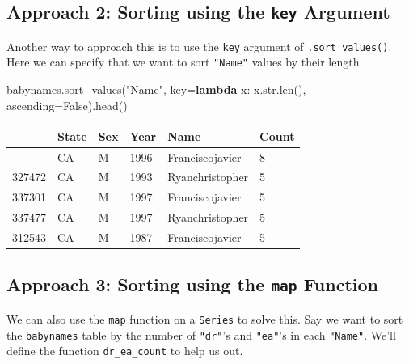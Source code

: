 \documentclass[
  letterpaper,
  DIV=11,
  numbers=noendperiod]{scrreprt}
\newenvironment{Shaded}{\begin{snugshade}}{\end{snugshade}}
\newcommand{\BuiltInTok}[1]{\textcolor[rgb]{0.00,0.23,0.31}{#1}}
\newcommand{\KeywordTok}[1]{\textcolor[rgb]{0.00,0.23,0.31}{\textbf{#1}}}
\newcommand{\NormalTok}[1]{\textcolor[rgb]{0.00,0.23,0.31}{#1}}
\newcommand{\OperatorTok}[1]{\textcolor[rgb]{0.37,0.37,0.37}{#1}}
\newcommand{\StringTok}[1]{\textcolor[rgb]{0.13,0.47,0.30}{#1}}
\newcommand{\VariableTok}[1]{\textcolor[rgb]{0.07,0.07,0.07}{#1}}
\begin{document}
\subsection{\texorpdfstring{Approach 2: Sorting using the \texttt{key}
Argument}{Approach 2: Sorting using the key Argument}}\label{approach-2-sorting-using-the-key-argument}

Another way to approach this is to use the \texttt{key} argument of
\texttt{.sort\_values()}. Here we can specify that we want to sort
\texttt{"Name"} values by their length.

\begin{Shaded}
\begin{Highlighting}[]
\NormalTok{babynames.sort\_values(}\StringTok{"Name"}\NormalTok{, key}\OperatorTok{=}\KeywordTok{lambda}\NormalTok{ x: x.}\BuiltInTok{str}\NormalTok{.}\BuiltInTok{len}\NormalTok{(), ascending}\OperatorTok{=}\VariableTok{False}\NormalTok{).head()}
\end{Highlighting}
\end{Shaded}

\begin{longtable}[]{@{}llllll@{}}
\toprule\noalign{}
& State & Sex & Year & Name & Count \\
\midrule\noalign{}
\endhead
\bottomrule\noalign{}
\endlastfoot
334166 & CA & M & 1996 & Franciscojavier & 8 \\
327472 & CA & M & 1993 & Ryanchristopher & 5 \\
337301 & CA & M & 1997 & Franciscojavier & 5 \\
337477 & CA & M & 1997 & Ryanchristopher & 5 \\
312543 & CA & M & 1987 & Franciscojavier & 5 \\
\end{longtable}

\subsection{\texorpdfstring{Approach 3: Sorting using the \texttt{map}
Function}{Approach 3: Sorting using the map Function}}\label{approach-3-sorting-using-the-map-function}

We can also use the \texttt{map} function on a \texttt{Series} to solve
this. Say we want to sort the \texttt{babynames} table by the number of
\texttt{"dr"}'s and \texttt{"ea"}'s in each \texttt{"Name"}. We'll
define the function \texttt{dr\_ea\_count} to help us out.
\end{document}
